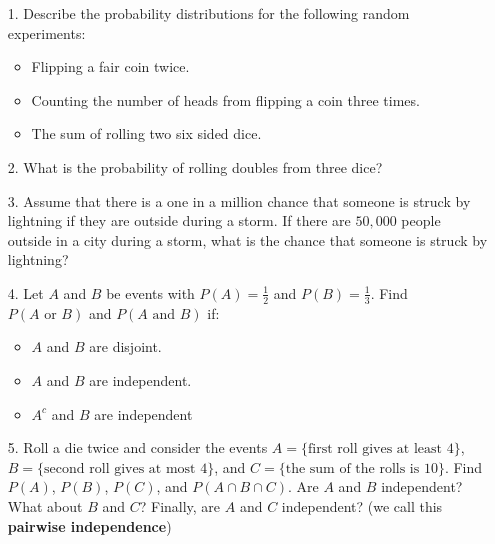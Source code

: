 \documentclass[oneside]{amsart}
\theoremstyle{definition}
\theoremstyle{definition}
\begin{document}
\begin{itemize}
    \item[1.] Describe the probability distributions for the following random experiments: 
    \begin{itemize}
        \item  Flipping a fair coin twice.

        \vfill

        \item Counting the number of heads from flipping a coin three times.
   
        \vfill

        \item The sum of rolling two six sided dice.

        \vfill

    \end{itemize}
   

    \item[2.] What is the probability of rolling doubles from three dice?
    
    \vfill

    
        \item[3.] Assume that there is a one in a million chance that someone is struck by lightning if they are outside during a storm. If there are $50,000$ people outside in a city during a storm, what is the chance that someone is struck by lightning? 
    
    \vfill

\newpage
        \item[4.] Let $A$ and $B$ be events with $P(A)=\frac{1}{2}$ and $P(B)=\frac{1}{3}$. Find $P( A \text{ or } B)$ and $P(A \text{ and }B)$ if:
        \begin{itemize}
            \item $A$ and $B$ are disjoint.
            \vfill

            \item $A$ and $B$ are independent.

            \vfill

            \item $A^c$ and $B$ are independent

            \vfill
        \end{itemize}

    \item[5.] Roll a die twice and consider the events $A = \{ \text{first roll gives at least 4} \}$, $B = \{ \text{second roll gives at most 4} \}$, and $C = \{ \text{the sum of the rolls is 10\}}$. Find $P(A)$, $P(B)$, $P(C)$, and $P(A \cap B \cap C)$. Are $A$ and $B$ independent? What about $B$ and $C$? Finally, are $A$ and $C$ independent? (we call this \textbf{pairwise independence})
    
    \vfill
    

    
\end{itemize}
\end{document}
